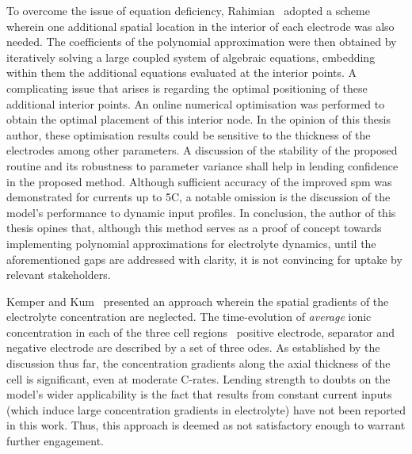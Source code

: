 To overcome the issue of  equation deficiency, Rahimian~\etal{} adopted a scheme
wherein one  additional spatial location in  the interior of each  electrode was
also needed. The coefficients of the polynomial approximation were then obtained
by iteratively solving a large  coupled system of algebraic equations, embedding
within  them  the additional  equations  evaluated  at  the interior  points.  A
complicating issue  that arises  is regarding the  optimal positioning  of these
additional interior  points. An online  numerical optimisation was  performed to
obtain  the optimal  placement of  this interior  node. In  the opinion  of this
thesis author, these optimisation results could be sensitive to the thickness of
the electrodes  among other  parameters. A  discussion of  the stability  of the
proposed routine and its robustness to  parameter variance shall help in lending
confidence in the proposed method.  Although sufficient accuracy of the improved
\gls{spm} was  demonstrated for  currents up  to 5C, a  notable omission  is the
discussion of the model's performance  to dynamic input profiles. In conclusion,
the author of this thesis opines that, although this method serves as a proof of
concept towards implementing polynomial approximations for electrolyte dynamics,
until the aforementioned  gaps are addressed with clarity, it  is not convincing
for uptake by relevant stakeholders.

Kemper  and  Kum~\cite{Kemper2013} presented  an  approach  wherein the  spatial
gradients  of the  electrolyte concentration  are neglected.  The time-evolution
of  \emph{average}  ionic  concentration  in  each of  the  three  cell  regions
\viz~positive electrode,  separator and  negative electrode  are described  by a
set  of three  \glspl{ode}.  As  established by  the  discussion  thus far,  the
concentration gradients  along the axial  thickness of the cell  is significant,
even at  moderate {C-rates}.  Lending strength  to doubts  on the  model's wider
applicability  is the  fact that  results  from constant  current inputs  (which
induce large concentration  gradients in electrolyte) have not  been reported in
this work. Thus,  this approach is deemed as not  satisfactory enough to warrant
further engagement.

